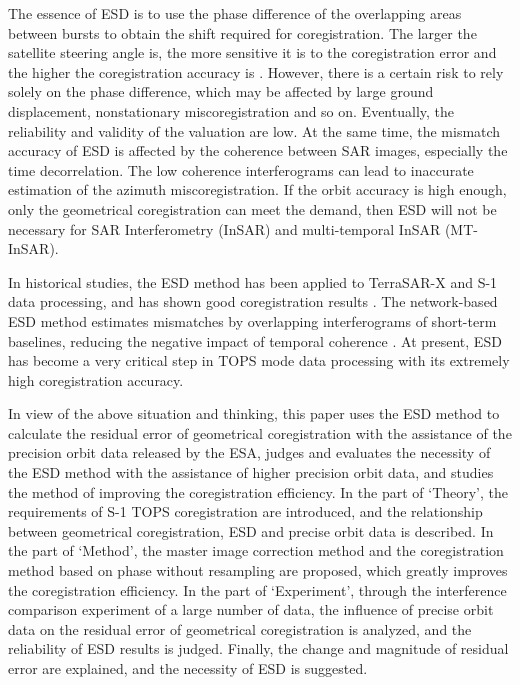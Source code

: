 \documentclass[preprint, authoryear]{elsarticle}
\begin{document}
The essence of ESD is to use the phase difference of the overlapping areas between bursts to obtain the shift required for coregistration. The larger the satellite steering angle is, the more sensitive it is to the coregistration error and the higher the coregistration accuracy is \cite{TOPS_Interferometry_With_TerraSAR-X}. However, there is a certain risk to rely solely on the phase difference, which may be affected by large ground displacement, nonstationary miscoregistration and so on. Eventually, the reliability and validity of the valuation are low. At the same time, the mismatch accuracy of ESD is affected by the coherence between SAR images, especially the time decorrelation. The low coherence interferograms can lead to inaccurate estimation of the azimuth miscoregistration. If the orbit accuracy is high enough, only the geometrical coregistration can meet the demand, then ESD will not be necessary for SAR Interferometry (InSAR) and multi-temporal InSAR (MT-InSAR). \par

In historical studies, the ESD method has been applied to TerraSAR-X and S-1 data processing, and has shown good coregistration results \cite{Interferometry_with_TOPS:_coregistration_and_azimuth_shifts, Interferometric_Processing_of_Sentinel-1_TOPS_Data}. The network-based ESD method estimates mismatches by overlapping interferograms of short-term baselines, reducing the negative impact of temporal coherence \cite{A_Network-Based_Enhanced_Spectral_Diversity_Approach_for_TOPS_Time-Series_Analysis}. At present, ESD has become a very critical step in TOPS mode data processing with its extremely high coregistration accuracy. \par

In view of the above situation and thinking, this paper uses the ESD method to calculate the residual error of geometrical coregistration with the assistance of the precision orbit data released by the ESA, judges and evaluates the necessity of the ESD method with the assistance of higher precision orbit data, and studies the method of improving the coregistration efficiency. In the part of ‘Theory’, the requirements of S-1 TOPS coregistration are introduced, and the relationship between geometrical coregistration, ESD and precise orbit data is described. In the part of ‘Method’, the master image correction method and the coregistration method based on phase without resampling are proposed, which greatly improves the coregistration efficiency. In the part of ‘Experiment’, through the interference comparison experiment of a large number of data, the influence of precise orbit data on the residual error of geometrical coregistration is analyzed, and the reliability of ESD results is judged. Finally, the change and magnitude of residual error are explained, and the necessity of ESD is suggested. \par
\end{document}
